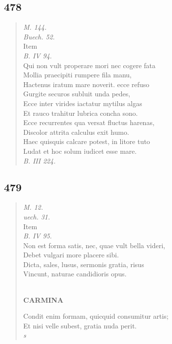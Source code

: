 \documentclass[11pt, a4paper]{report}
\begin{document}
            \subsection*{478}
      \begin{verse}
      \textit{M. 144.} \\ \textit{Buech. 52.} \\ Item \\ \textit{B. IV 94.} \\ Qui non vult properare mori nec cogere fata \\ Mollia praecipiti rumpere fila manu, \\ Hactenus iratum mare noverit. ecce refuso \\ Gurgite securos subluit unda pedes, \\ Ecce inter virides iactatur mytilus algas \\ Et rauco trahitur lubrica concha sono. \\ Ecce recurrentes qua versat fluctus harenas, \\ Discolor attrita calculus exit humo. \\ Haec quisquis calcare potest, in litore tuto \\ Ludat et hoc solum iudicet esse mare. \\ \textit{B. III 224.} \\ 
      \end{verse}
  
            \subsection*{479}
      \begin{verse}
      \textit{M. 12.} \\ \textit{uech. 31.} \\ Item \\ \textit{B. IV 95.} \\ Non est forma satis, nec, quae vult bella videri, \\ Debet vulgari more placere sibi. \\ Dicta, sales, lusus, sermonis gratia, risus \\ Vincunt, naturae candidioris opus. \\ 
        ﻿\pagebreak 
     \marginpar{[350]} \begin{center} \textbf{CARMINA} \end{center}Condit enim formam, quicquid consumitur artis; \\ Et nisi velle subest, gratia nuda perit. \\ \textit{s} \\ 
      \end{verse}
  
\end{document}
